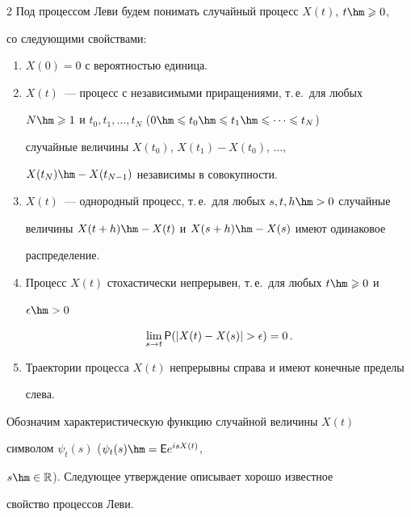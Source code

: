 \begin{multicols}{2}
Под процессом Леви будем понимать случайный процесс $X(t)$, $t\hm\geqslant0$,

со следующими свойствами:

\begin{enumerate}

\item[1$^{\circ}$] $X(0)=0$ с вероятностью единица.

\item[2$^{\circ}$] $X(t)$~--- процесс с независимыми приращениями, т.\,е.\ для любых

$N\hm\geqslant1$ и $t_0,t_1,\dots ,t_N$ ($0\hm\leqslant t_0\hm\leqslant t_1\hm\leqslant\cdots \leqslant t_N$)

случайные величины $X(t_0)$, $X(t_1)-X(t_0)$, $\dots ,$

$X(t_N)\hm-X(t_{N-1})$ независимы в совокупности.

\item[3$^{\circ}$] $X(t)$~--- однородный процесс, т.\,е.\ для любых $s,t,h\hm>0$ случайные

величины $X(t+h)\hm-X(t)$ и $X(s+h)\hm-X(s)$ имеют одинаковое

распределение.

\item[4$^{\circ}$] Процесс $X(t)$ стохастически непрерывен, т.\,е.\ для любых $t\hm\geqslant0$ и

$\epsilon\hm>0$

$$

\lim\limits_{s\to t}{\sf P}(|X(t)-X(s)|>\epsilon)=0\,.

$$

\item[5$^{\circ}$] Траектории процесса $X(t)$ непрерывны справа и имеют конечные пределы

слева.

\end{enumerate}



\smallskip



Обозначим характеристическую функцию случайной величины $X(t)$

символом $\psi_t(s)$ ($\psi_t(s)\hm={\sf E}e^{isX(t)}$,

$s\hm\in\mathbb{R}$). Следующее утверждение описывает хорошо известное

свойство процессов Леви.



\smallskip




\end{multicols}
